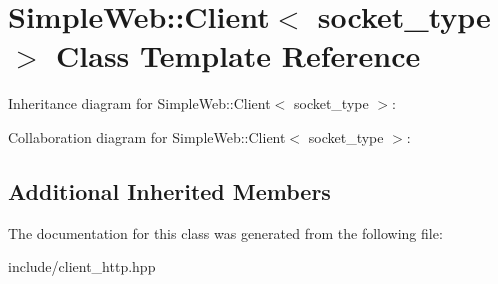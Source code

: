 \hypertarget{classSimpleWeb_1_1Client}{}\section{Simple\+Web\+:\+:Client$<$ socket\+\_\+type $>$ Class Template Reference}
\label{classSimpleWeb_1_1Client}


Inheritance diagram for Simple\+Web\+:\+:Client$<$ socket\+\_\+type $>$\+:


Collaboration diagram for Simple\+Web\+:\+:Client$<$ socket\+\_\+type $>$\+:
\subsection*{Additional Inherited Members}


The documentation for this class was generated from the following file\+:\begin{DoxyCompactItemize}
\item 
include/client\+\_\+http.\+hpp\end{DoxyCompactItemize}
